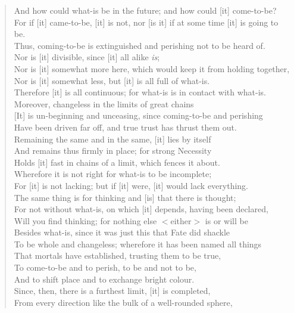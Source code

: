 \begin{quotation}
And how could what-is be in the future; and how could [it] come-to-be?\\
For if [it] came-to-be, [it] is not, nor [is it] if at some time [it] is going to be.\\
Thus, coming-to-be is extinguished and perishing not to be heard of.\\
Nor is [it] divisible, since [it] all alike \textit{is};\\
Nor is [it] somewhat more here, which would keep it from holding together,\\
Nor is [it] somewhat less, but [it] is all full of what-is.\\
Therefore [it] is all continuous; for what-is is in contact with what-is.\\
Moreover, changeless in the limits of great chains\\ 
\hspace{0pt}[It] is un-beginning and unceasing, since coming-to-be and perishing\\
Have been driven far off, and true trust has thrust them out.\\
Remaining the same and in the same, [it] lies by itself\\
And remains thus firmly in place; for strong Necessity\\
Holds [it] fast in chains of a limit, which fences it about.\\
Wherefore it is not right for what-is to be incomplete;\\
For [it] is not lacking; but if [it] were, [it] would lack everything.\\
The same thing is for thinking and [is] that there is thought;\\
For not without what-is, on which [it] depends, having been declared,\\
Will you find thinking; for nothing else $<$either$>$ is or will be\\
Besides what-is, since it was just this that Fate did shackle\\
To be whole and changeless; wherefore it has been named all things\\
That mortals have established, trusting them to be true,\\
To come-to-be and to perish, to be and not to be,\\
And to shift place and to exchange bright colour.\\
Since, then, there is a furthest limit, [it] is completed,\\
From every direction like the bulk of a well-rounded sphere,\\

\end{quotation}

